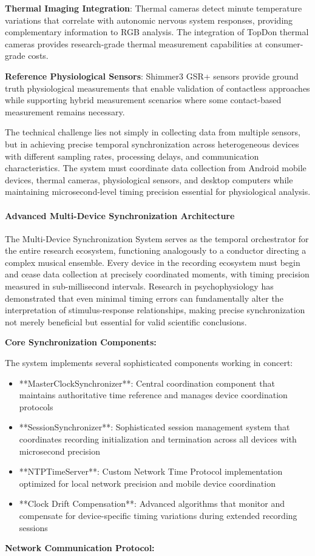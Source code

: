 \documentclass[11pt,a4paper]{report}
\begin{document}
\textbf{Thermal Imaging Integration}: Thermal cameras detect minute temperature variations that correlate with autonomic
nervous system responses, providing complementary information to RGB analysis. The integration of TopDon thermal cameras
provides research-grade thermal measurement capabilities at consumer-grade costs.

\textbf{Reference Physiological Sensors}: Shimmer3 GSR+ sensors provide ground truth physiological measurements that enable
validation of contactless approaches while supporting hybrid measurement scenarios where some contact-based measurement
remains necessary.

The technical challenge lies not simply in collecting data from multiple sensors, but in achieving precise temporal
synchronization across heterogeneous devices with different sampling rates, processing delays, and communication
characteristics. The system must coordinate data collection from Android mobile devices, thermal cameras, physiological
sensors, and desktop computers while maintaining microsecond-level timing precision essential for physiological
analysis.

\paragraph{Advanced Multi-Device Synchronization Architecture}

The Multi-Device Synchronization System serves as the temporal orchestrator for the entire research ecosystem,
functioning analogously to a conductor directing a complex musical ensemble. Every device in the recording ecosystem
must begin and cease data collection at precisely coordinated moments, with timing precision measured in sub-millisecond
intervals. Research in psychophysiology has demonstrated that even minimal timing errors can fundamentally alter the
interpretation of stimulus-response relationships, making precise synchronization not merely beneficial but essential
for valid scientific conclusions.

\textbf{Core Synchronization Components:}

The system implements several sophisticated components working in concert:

\begin{itemize}
\item **MasterClockSynchronizer**: Central coordination component that maintains authoritative time reference and manages
  device coordination protocols
\item **SessionSynchronizer**: Sophisticated session management system that coordinates recording initialization and
  termination across all devices with microsecond precision
\item **NTPTimeServer**: Custom Network Time Protocol implementation optimized for local network precision and mobile device
  coordination
\item **Clock Drift Compensation**: Advanced algorithms that monitor and compensate for device-specific timing variations
  during extended recording sessions

\end{itemize}
\textbf{Network Communication Protocol:}
\end{document}
